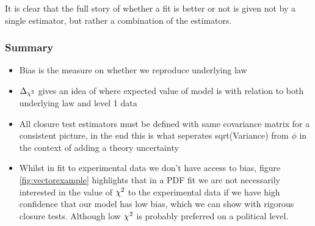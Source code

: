 It is clear that the full story of whether a fit is better or not is given not
by a single estimator, but rather a combination of the estimators.

\subsubsection*{Summary}

\begin{itemize}
    \item Bias is the measure on whether we reproduce underlying law
    \item $\Delta_{\chi^{2}}$ gives an idea of where expected value of model is with relation
        to both underlying law and level 1 data
    \item All closure test estimators must be defined with same covariance matrix
        for a consistent picture, in the end this is what seperates sqrt(Variance) from $\phi$
        in the context of adding a theory uncertainty
    \item Whilst in fit to experimental data we don't have access to bias,
        figure \ref{fig:vectorexample} highlights that in a PDF fit we are not
        necessarily interested in the value of $\chi^{2}$ to the experimental data
        if we have high confidence that our model has low bias, which we can
        show with rigorous closure tests. Although low $\chi^{2}$ is probably
        preferred on a political level.
\end{itemize}
